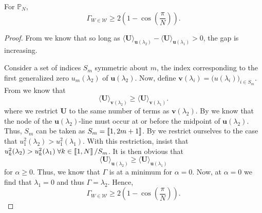     \begin{thm}
      For $\mathbb{P}_N$,
      \begin{equation}
      	\Gamma_{W \in \mathcal{W}} \geq 2\left(1-\cos\left(\frac{\pi}{N}\right)\right).
      \end{equation}
    \end{thm}

    \begin{proof}
      From  we know that so long as $\langle \mathbf{U} \rangle_{\mathbf{u}(\lambda_2)} - \langle \mathbf{U} \rangle_{\mathbf{u}(\lambda_1)} > 0$, the gap is increasing.

      Consider a set of indices $S_m$ symmetric about $m$, the index corresponding to the first generalized zero $u_m(\lambda_2)$ of $\mathbf{u}(\lambda_2)$. Now, define $\mathbf{v}(\lambda_i) = \big(u(\lambda_i)\big)_{i\in S_m}$. From  we know that
      \begin{equation}
      	\big\langle \mathbf{U} \big\rangle_{\mathbf{v}(\lambda_2)} \geq \big\langle \mathbf{U} \big\rangle_{\mathbf{v}(\lambda_1)}.
      \end{equation}
      where we restrict $\mathbf{U}$ to the same number of terms as $\mathbf{v}(\lambda_2)$.
      By  we know that the node of the $\mathbf{u}(\lambda_2)$-line must occur at or before the midpoint of $\mathbf{u}(\lambda_2)$. Thus, $S_m$ can be taken as $S_m = \left \llbracket 1 , 2m+1 \right \rrbracket$. By  we restrict ourselves to the case that $u_1^2(\lambda_2) > u_1^2(\lambda_1)$. With this restriction,  insist that $u_k^2(\lambda_2) > u_k^2(\lambda_1) \; \forall k \in \left \llbracket 1 , N \right \rrbracket/S_m$. It is then obvious that
      \begin{equation}
      	\big\langle \mathbf{U} \big\rangle_{\mathbf{u}(\lambda_2)} \geq \big\langle \mathbf{U} \big\rangle_{\mathbf{u}(\lambda_1)}
      \end{equation}
      for $\alpha \geq 0$. Thus, we know that $\Gamma$ is at a minimum for $\alpha=0$. Now, at $\alpha=0$ we find that $\lambda_1=0$ and thus $\Gamma = \lambda_2$. Hence,
      \begin{equation}
	\Gamma_{W \in \mathcal{W}} \geq 2\left(1-\cos\left(\frac{\pi}{N}\right)\right).
      \end{equation}
    \end{proof}

